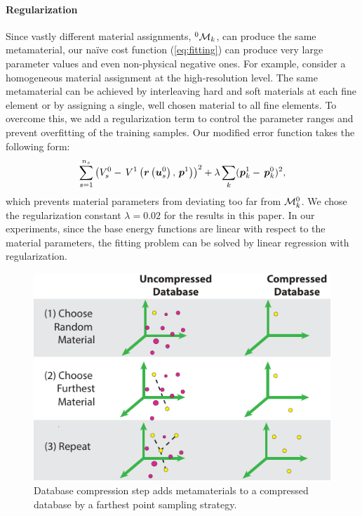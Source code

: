 \paragraph{Regularization} Since vastly different material assignments, $^0\mathcal{M}_k$, can produce the same metamaterial, our na\"{i}ve cost function (\autoref{eq:fitting}) can produce very large parameter values and even non-physical negative ones.
For example, consider a homogeneous material assignment at the high-resolution level.
The same metamaterial can be achieved by interleaving hard and soft materials at each fine element or by assigning a single, well chosen material to all fine elements.
To overcome this, we add a regularization term to control the parameter ranges and prevent overfitting of the training samples.
Our modified error function takes the following form:
\begin{equation}
\sum_{s=1}^{n_s}\left(V_s^0- \, V^1\left(\mbox{$\bm{r}$}\left(\mbox{$\bm{u}$}_s^0\right), \, \mbox{$\bm{p}$}^1\right)\right)^2 + 
\lambda\sum_k (\mbox{$\bm{p}$}_k^1 - \, \mbox{$\bm{p}$}_k^0)^2,
\end{equation}
which prevents material parameters from deviating too far from  $\mathcal{M}_k^0$.
We chose the regularization constant $\lambda=0.02$ for the results in this paper.
In our experiments, since the base energy functions are linear with respect to the material parameters, the fitting problem can be solved by linear regression with regularization.

\begin{figure}
	\centering
	\includegraphics[width=0.6\columnwidth]{images/compression}
	\caption{Database compression step adds metamaterials to a compressed database by a farthest point sampling strategy.}
	\label{fig:compression}
\end{figure}

